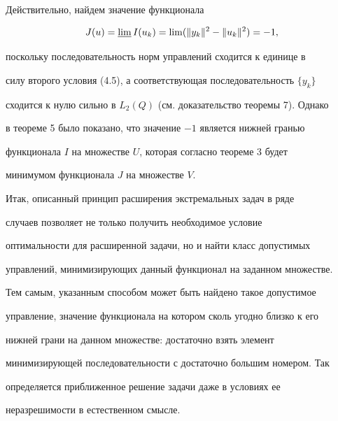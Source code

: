 Действительно, найдем значение функционала 


$$ 


J(u)=\varliminf I(u_k)=\lim(\|y_k\|^2-\|u_k\|^2)=-1, 


$$ 


поскольку последовательность норм управлений сходится к единице в 


силу второго условия (4.5), а соответствующая последовательность $\{y_k\}$ 


сходится к нулю сильно в $L_2(Q)$ (см. доказательство теоремы 7). Однако 


в теореме 5 было показано, что значение $-1$ является нижней гранью 


функционала $I$ на множестве $U$, которая согласно теореме 3 будет 


минимумом функционала $J$ на множестве $V$. 


 


Итак, описанный принцип расширения экстремальных задач в ряде 


случаев позволяет не только получить необходимое условие 


оптимальности для расширенной задачи, но и найти класс допустимых 


управлений, минимизирующих данный функционал на заданном множестве. 


Тем самым, указанным способом может быть найдено такое допустимое 


управление, значение функционала на котором сколь угодно близко к его 


нижней грани на данном множестве: достаточно взять элемент 


минимизирующей последовательности с достаточно большим номером. Так 


определяется приближенное решение задачи даже в условиях ее 


неразрешимости в естественном смысле. 


 


